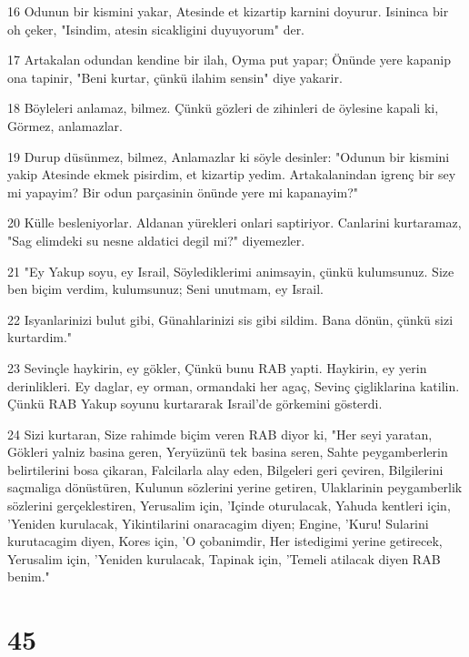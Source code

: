\par 16 Odunun bir kismini yakar, Atesinde et kizartip karnini doyurur. Isininca bir oh çeker, "Isindim, atesin sicakligini duyuyorum" der.
\par 17 Artakalan odundan kendine bir ilah, Oyma put yapar; Önünde yere kapanip ona tapinir, "Beni kurtar, çünkü ilahim sensin" diye yakarir.
\par 18 Böyleleri anlamaz, bilmez. Çünkü gözleri de zihinleri de öylesine kapali ki, Görmez, anlamazlar.
\par 19 Durup düsünmez, bilmez, Anlamazlar ki söyle desinler: "Odunun bir kismini yakip Atesinde ekmek pisirdim, et kizartip yedim. Artakalanindan igrenç bir sey mi yapayim? Bir odun parçasinin önünde yere mi kapanayim?"
\par 20 Külle besleniyorlar. Aldanan yürekleri onlari saptiriyor. Canlarini kurtaramaz, "Sag elimdeki su nesne aldatici degil mi?" diyemezler.
\par 21 "Ey Yakup soyu, ey Israil, Söylediklerimi animsayin, çünkü kulumsunuz. Size ben biçim verdim, kulumsunuz; Seni unutmam, ey Israil.
\par 22 Isyanlarinizi bulut gibi, Günahlarinizi sis gibi sildim. Bana dönün, çünkü sizi kurtardim."
\par 23 Sevinçle haykirin, ey gökler, Çünkü bunu RAB yapti. Haykirin, ey yerin derinlikleri. Ey daglar, ey orman, ormandaki her agaç, Sevinç çigliklarina katilin. Çünkü RAB Yakup soyunu kurtararak Israil'de görkemini gösterdi.
\par 24 Sizi kurtaran, Size rahimde biçim veren RAB diyor ki, "Her seyi yaratan, Gökleri yalniz basina geren, Yeryüzünü tek basina seren, Sahte peygamberlerin belirtilerini bosa çikaran, Falcilarla alay eden, Bilgeleri geri çeviren, Bilgilerini saçmaliga dönüstüren, Kulunun sözlerini yerine getiren, Ulaklarinin peygamberlik sözlerini gerçeklestiren, Yerusalim için, 'Içinde oturulacak, Yahuda kentleri için, 'Yeniden kurulacak, Yikintilarini onaracagim diyen; Engine, 'Kuru! Sularini kurutacagim diyen, Kores için, 'O çobanimdir, Her istedigimi yerine getirecek, Yerusalim için, 'Yeniden kurulacak, Tapinak için, 'Temeli atilacak diyen RAB benim."

\chapter{45}

